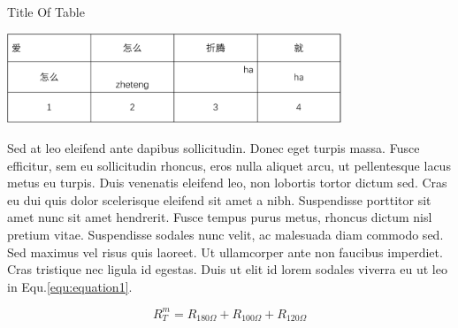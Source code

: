 \begin{table}[h]
\label{tab:tab2}
\centering
\caption{ Title Of Table }
\includegraphics[width=10cm]{fig/table.pdf}
\end{table}

Sed at leo eleifend ante dapibus sollicitudin. Donec eget turpis massa. Fusce efficitur, sem eu sollicitudin rhoncus, eros nulla aliquet arcu, ut pellentesque lacus metus eu turpis. Duis venenatis eleifend leo, non lobortis tortor dictum sed. Cras eu dui quis dolor scelerisque eleifend sit amet a nibh. Suspendisse porttitor sit amet nunc sit amet hendrerit. Fusce tempus purus metus, rhoncus dictum nisl pretium vitae. Suspendisse sodales nunc velit, ac malesuada diam commodo sed. Sed maximus vel risus quis laoreet. Ut ullamcorper ante non faucibus imperdiet. Cras tristique nec ligula id egestas. Duis ut elit id lorem sodales viverra eu ut leo in Equ.\ref{equ:equation1}.

\begin{equation}\label{equ:equation1}
R^m_T=R_{180\Omega}+R_{100\Omega}+R_{120\Omega}
\end{equation}


